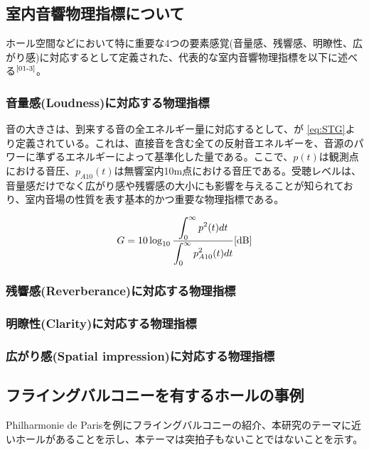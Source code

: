 \subsection{室内音響物理指標について}
ホール空間などにおいて特に重要な4つの要素感覚(音量感、残響感、明瞭性、広がり感)に対応するとして定義された、代表的な室内音響物理指標を以下に述べる$^{\text{\cite{01-3}}}$。

\subsubsection{音量感(Loudness)に対応する物理指標}
音の大きさは、到来する音の全エネルギー量に対応するとして、\STG が \ref{eq:STG}より定義されている。これは、直接音を含む全ての反射音エネルギーを、音源のパワーに準ずるエネルギーによって基準化した量である。ここで、$p(t)$は観測点における音圧、$p_{A10}(t)$は無響室内10m点における音圧である。受聴レベルは、音量感だけでなく広がり感や残響感の大小にも影響を与えることが知られており、室内音場の性質を表す基本的かつ重要な物理指標である。

\begin{equation}
  \label{eq:STG}
  G = 10\log_{10}{\frac{\displaystyle\int_0^{\infty}p^2(t)dt}{\displaystyle\int_0^{\infty}p_{A10}^2(t)dt}} \textrm{[dB]}
\end{equation}

\subsubsection{残響感(Reverberance)に対応する物理指標}

\EDT

\subsubsection{明瞭性(Clarity)に対応する物理指標}

\Clarity

\subsubsection{広がり感(Spatial impression)に対応する物理指標}

\subsection{フライングバルコニーを有するホールの事例}
Philharmonie de Parisを例にフライングバルコニーの紹介、本研究のテーマに近いホールがあることを示し、本テーマは突拍子もないことではないことを示す。

